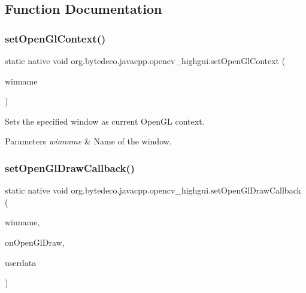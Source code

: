 \subsection{Function Documentation}
\mbox{\label{group__highgui__opengl_ga14e8539bd809672c266a0dc6c11e4b91}} 
\subsubsection{\texorpdfstring{set\+Open\+Gl\+Context()}{setOpenGlContext()}}
{\footnotesize\ttfamily static native void org.\+bytedeco.\+javacpp.\+opencv\+\_\+highgui.\+set\+Open\+Gl\+Context (\begin{DoxyParamCaption}\item[{@Str Byte\+Pointer}]{winname }\end{DoxyParamCaption})\hspace{0.3cm}{\ttfamily [static]}}



Sets the specified window as current Open\+GL context. 


\begin{DoxyParams}{Parameters}
{\em winname} & Name of the window. \\
\hline
\end{DoxyParams}
\mbox{\label{group__highgui__opengl_ga4a0f34ee4ef2378ca514ab2190004a9c}} 
\subsubsection{\texorpdfstring{set\+Open\+Gl\+Draw\+Callback()}{setOpenGlDrawCallback()}}
{\footnotesize\ttfamily static native void org.\+bytedeco.\+javacpp.\+opencv\+\_\+highgui.\+set\+Open\+Gl\+Draw\+Callback (\begin{DoxyParamCaption}\item[{@Str Byte\+Pointer}]{winname,  }\item[{Open\+Gl\+Draw\+Callback}]{on\+Open\+Gl\+Draw,  }\item[{Pointer}]{userdata }\end{DoxyParamCaption})\hspace{0.3cm}{\ttfamily [static]}}



